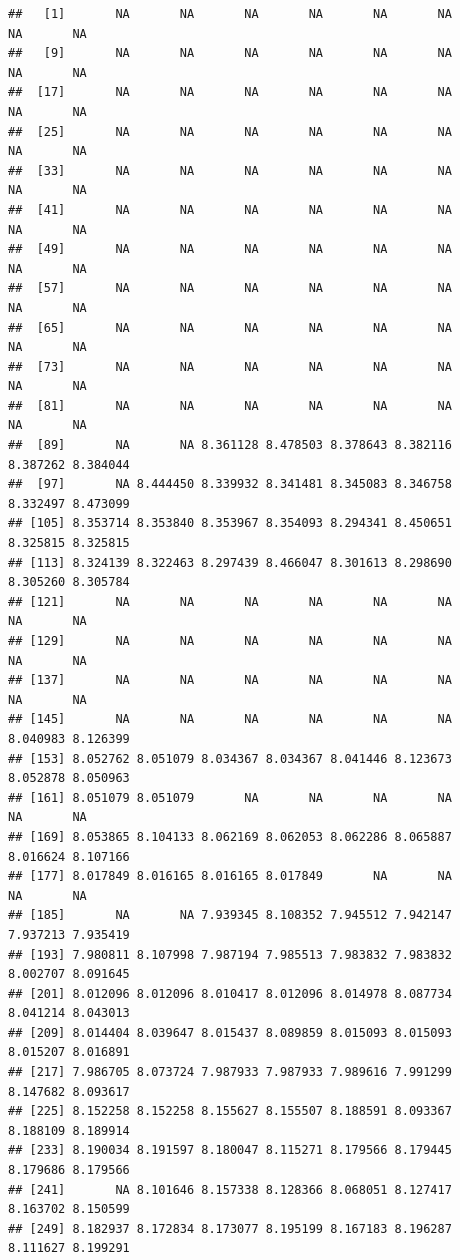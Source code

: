 \documentclass[
]{article}
\begin{document}
\begin{verbatim}
##   [1]       NA       NA       NA       NA       NA       NA       NA       NA
##   [9]       NA       NA       NA       NA       NA       NA       NA       NA
##  [17]       NA       NA       NA       NA       NA       NA       NA       NA
##  [25]       NA       NA       NA       NA       NA       NA       NA       NA
##  [33]       NA       NA       NA       NA       NA       NA       NA       NA
##  [41]       NA       NA       NA       NA       NA       NA       NA       NA
##  [49]       NA       NA       NA       NA       NA       NA       NA       NA
##  [57]       NA       NA       NA       NA       NA       NA       NA       NA
##  [65]       NA       NA       NA       NA       NA       NA       NA       NA
##  [73]       NA       NA       NA       NA       NA       NA       NA       NA
##  [81]       NA       NA       NA       NA       NA       NA       NA       NA
##  [89]       NA       NA 8.361128 8.478503 8.378643 8.382116 8.387262 8.384044
##  [97]       NA 8.444450 8.339932 8.341481 8.345083 8.346758 8.332497 8.473099
## [105] 8.353714 8.353840 8.353967 8.354093 8.294341 8.450651 8.325815 8.325815
## [113] 8.324139 8.322463 8.297439 8.466047 8.301613 8.298690 8.305260 8.305784
## [121]       NA       NA       NA       NA       NA       NA       NA       NA
## [129]       NA       NA       NA       NA       NA       NA       NA       NA
## [137]       NA       NA       NA       NA       NA       NA       NA       NA
## [145]       NA       NA       NA       NA       NA       NA 8.040983 8.126399
## [153] 8.052762 8.051079 8.034367 8.034367 8.041446 8.123673 8.052878 8.050963
## [161] 8.051079 8.051079       NA       NA       NA       NA       NA       NA
## [169] 8.053865 8.104133 8.062169 8.062053 8.062286 8.065887 8.016624 8.107166
## [177] 8.017849 8.016165 8.016165 8.017849       NA       NA       NA       NA
## [185]       NA       NA 7.939345 8.108352 7.945512 7.942147 7.937213 7.935419
## [193] 7.980811 8.107998 7.987194 7.985513 7.983832 7.983832 8.002707 8.091645
## [201] 8.012096 8.012096 8.010417 8.012096 8.014978 8.087734 8.041214 8.043013
## [209] 8.014404 8.039647 8.015437 8.089859 8.015093 8.015093 8.015207 8.016891
## [217] 7.986705 8.073724 7.987933 7.987933 7.989616 7.991299 8.147682 8.093617
## [225] 8.152258 8.152258 8.155627 8.155507 8.188591 8.093367 8.188109 8.189914
## [233] 8.190034 8.191597 8.180047 8.115271 8.179566 8.179445 8.179686 8.179566
## [241]       NA 8.101646 8.157338 8.128366 8.068051 8.127417 8.163702 8.150599
## [249] 8.182937 8.172834 8.173077 8.195199 8.167183 8.196287 8.111627 8.199291

\end{verbatim}
\end{document}
